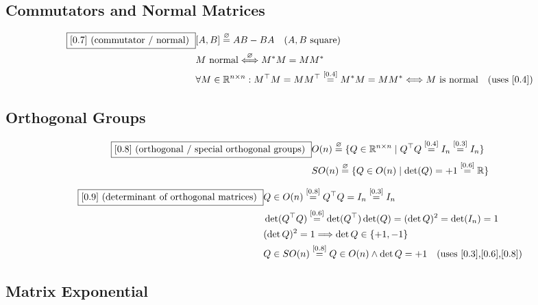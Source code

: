 \documentclass[11pt]{article}
\newcommand{\eqdef}{\overset{\varnothing}{=}}
\newcommand{\eqref}[1]{\overset{[#1]}{=}}
\begin{document}
\subsection{Commutators and Normal Matrices}

\begin{align}
\boxed{[0.7] \text{ (commutator / normal) }}
&[A,B]
\eqdef
AB - BA
\quad(A,B\text{ square}) \notag\\
&M
\text{ normal}
\overset{\varnothing}{\Longleftrightarrow}
M^* M
=
M M^* \notag\\
&\forall M\in\mathbb{R}^{n\times n}:
M^\top M = M M^\top
\eqref{0.4}
M^* M = M M^*
\Longleftrightarrow
M \text{ is normal}
\quad(\text{uses [0.4]})
\end{align}

\subsection{Orthogonal Groups}

\begin{align}
\boxed{[0.8] \text{ (orthogonal / special orthogonal groups) }}
&O(n)
\eqdef
\{Q\in\mathbb{R}^{n\times n}
\mid
Q^\top Q
\eqref{0.4}
I_n
\eqref{0.3}
I_n
\} \notag\\
&SO(n)
\eqdef
\{Q\in O(n)
\mid
\det(Q)=+1
\eqref{0.6}
\mathbb{R}
\}
\end{align}

\begin{align}
\boxed{[0.9] \text{ (determinant of orthogonal matrices) }}
&Q \in O(n)
\eqref{0.8}
Q^\top Q
=
I_n
\eqref{0.3}
I_n \notag\\
&\det(Q^\top Q)
\eqref{0.6}
\det(Q^\top)\det(Q)
=
(\det Q)^2
=
\det(I_n)
=
1 \notag\\
&(\det Q)^2 = 1
\Longrightarrow
\det Q \in \{+1,-1\} \notag\\
&Q\in SO(n)
\eqref{0.8}
Q\in O(n)
\wedge
\det Q = +1
\quad(\text{uses [0.3],[0.6],[0.8]})
\end{align}

\subsection{Matrix Exponential}
\end{document}
